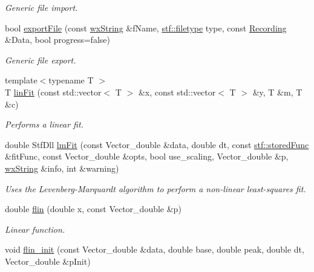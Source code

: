 \begin{DoxyCompactItemize}
\begin{DoxyCompactList}\small\item\em Generic file import. \item\end{DoxyCompactList}\item 
bool \hyperlink{group__stfgen_ga502a391afc11e955c34aa4a6efc208af}{exportFile} (const \hyperlink{classwxString}{wxString} \&fName, \hyperlink{group__stfgen_gae703f7802498ae301ac058b94426900f}{stf::filetype} type, const \hyperlink{classRecording}{Recording} \&Data, bool progress=false)
\begin{DoxyCompactList}\small\item\em Generic file export. \item\end{DoxyCompactList}\item 
{\footnotesize template$<$typename T $>$ }\\T \hyperlink{group__stfgen_ga29e77fd36f4c103444287e9c5b807ab9}{linFit} (const std::vector$<$ T $>$ \&x, const std::vector$<$ T $>$ \&y, T \&m, T \&c)
\begin{DoxyCompactList}\small\item\em Performs a linear fit. \item\end{DoxyCompactList}\item 
double StfDll \hyperlink{group__stfgen_gacf43d0ea16185a30745919255f231c80}{lmFit} (const Vector\_\-double \&data, double dt, const \hyperlink{structstf_1_1storedFunc}{stf::storedFunc} \&fitFunc, const Vector\_\-double \&opts, bool use\_\-scaling, Vector\_\-double \&p, \hyperlink{classwxString}{wxString} \&info, int \&warning)
\begin{DoxyCompactList}\small\item\em Uses the Levenberg-\/Marquardt algorithm to perform a non-\/linear least-\/squares fit. \item\end{DoxyCompactList}\item 
double \hyperlink{group__stfgen_ga96ce124f20c81dcdac988e31770b65c5}{flin} (double x, const Vector\_\-double \&p)
\begin{DoxyCompactList}\small\item\em Linear function. \item\end{DoxyCompactList}\item 
\hypertarget{group__stfgen_gacf47eaaf817ab9f675c36f1b77811fd9}{
void \hyperlink{group__stfgen_gacf47eaaf817ab9f675c36f1b77811fd9}{flin\_\-init} (const Vector\_\-double \&data, double base, double peak, double dt, Vector\_\-double \&pInit)}
\label{group__stfgen_gacf47eaaf817ab9f675c36f1b77811fd9}


\end{DoxyCompactItemize}
